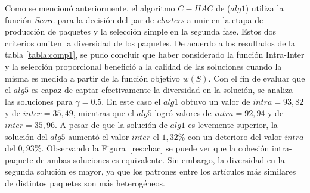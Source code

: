Como se mencionó anteriormente, el algoritmo $C-HAC$ de \cite{compositeRetrival} ($alg1$) utiliza la función $Score$ para la decisión del par de {\em clusters} a unir en la etapa de producción de paquetes y la selección simple en la segunda fase. Estos dos criterios omiten la diversidad de los paquetes. De acuerdo a los resultados de la tabla \ref{tabla:comp1}, se pudo concluir que haber considerado la función Intra-Inter y la selección proporcional benefició a la calidad de las soluciones cuando la misma es medida a partir de la función objetivo $w(S)$. Con el fin de evaluar que el $alg5$ es capaz de captar efectivamente la diversidad en la solución, se analiza las soluciones para $\gamma=0.5$. En este caso el $alg1$ obtuvo un valor de $intra=93,82$ y de $inter=35,49$, mientras que el $alg5$ logró valores de $intra=92,94$ y de $inter=35,96$. A pesar de que la solución de $alg1$ es levemente superior, la solución del $alg5$ aumentó el valor $inter$ el $1,32\%$ con un deterioro del valor $intra$ del $0,93\%$. Observando la Figura~\ref{res:chac} se puede ver que la cohesión intra-paquete de ambas soluciones es equivalente. Sin embargo, la diversidad en la segunda solución es mayor, ya que los patrones entre los artículos más similares de distintos paquetes son más heterogéneos. 

